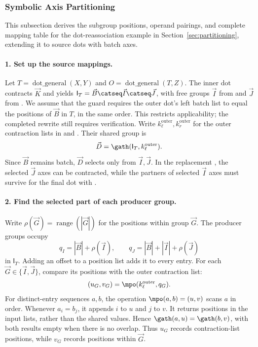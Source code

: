\subsubsection{Symbolic Axis Partitioning}
\label{extended:sec:partitioning}
This subsection derives the subgroup positions, operand pairings, and complete
mapping table for the dot-reassociation example in
Section~\ref{sec:partitioning}, extending it to source dots with batch axes.

\paragraph{1. Set up the source mappings.}
Let $T=\operatorname{dot\_general}(X,Y)$ and
$O=\operatorname{dot\_general}(T,Z)$. The inner dot contracts $\vec K$ and
yields $\mathsf{I}_T=\vec B\catseq \vec I\catseq \vec J$, with free groups $\vec I$ from  and
$\vec J$ from . We assume that the  guard requires the outer
dot's left batch list to equal the positions of $\vec B$ in $T$, in the same
order. This restricts applicability; the completed rewrite still requires
verification. Write $k_\ell^{\mathrm{outer}},k_r^{\mathrm{outer}}$ for the
outer contraction lists in  and . Their shared group is
\begin{equation}
 \vec D=\gath(\mathsf{I}_T,k_\ell^{\mathrm{outer}}).
\end{equation}
Since $\vec B$ remains batch, $\vec D$ selects only from $\vec I,\vec J$. In the replacement
, the selected $\vec J$ axes can be contracted, while
the partners of selected $\vec I$ axes must survive for the final dot with .

\paragraph{2. Find the selected part of each producer group.}
Write $\rho(\vec G)=\operatorname{range}(|\vec G|)$ for the positions within group $\vec G$.
The producer groups occupy
\begin{equation}
 q_I=|\vec B|+\rho(\vec I),\qquad q_J=|\vec B|+|\vec I|+\rho(\vec J)
\end{equation}
in $\mathsf{I}_T$. Adding an offset to a position list adds it to every entry.
For each $\vec G\in\{\vec I,\vec J\}$, compare its positions with the outer contraction list:
\begin{equation}
 (u_G,v_G)=\mpo(k_\ell^{\mathrm{outer}},q_G).
\end{equation}
For distinct-entry sequences $a,b$, the operation
$\mpo(a,b)=(u,v)$ scans $a$ in order. Whenever $a_i=b_j$, it appends $i$ to
$u$ and $j$ to $v$. It returns positions in the input lists, rather than
the shared values. Hence $\gath(a,u)=\gath(b,v)$, with both results empty
when there is no overlap. Thus $u_G$ records contraction-list positions,
while $v_G$ records positions within $\vec G$.

